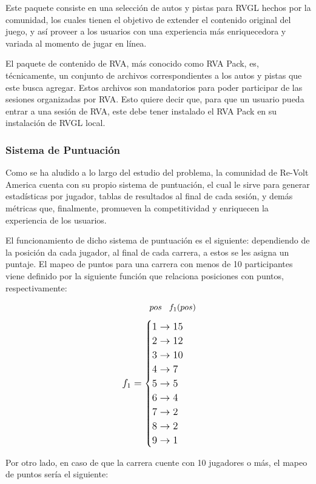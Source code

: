 Este paquete consiste en una selección de autos y pistas para RVGL hechos por la comunidad, los cuales tienen el objetivo de extender el contenido original del juego, y así proveer a los usuarios con una experiencia más enriquecedora y variada al momento de jugar en línea.

El paquete de contenido de RVA, más conocido como RVA Pack, es, técnicamente, un conjunto de archivos correspondientes a los autos y pistas que este busca agregar. Estos archivos son mandatorios para poder participar de las sesiones organizadas por RVA. Esto quiere decir que, para que un usuario pueda entrar a una sesión de RVA, este debe tener instalado el RVA Pack en su instalación de RVGL local.

\subsubsection{Sistema de Puntuación}
Como se ha aludido a lo largo del estudio del problema, la comunidad de Re-Volt America cuenta con su propio sistema de puntuación, el cual le sirve para generar estadísticas por jugador, tablas de resultados al final de cada sesión, y demás métricas que, finalmente, promueven la competitividad y enriquecen la experiencia de los usuarios.

El funcionamiento de dicho sistema de puntuación es el siguiente: dependiendo de la posición da cada jugador, al final de cada carrera, a estos se les asigna un puntaje. El mapeo de puntos para una carrera con menos de 10 participantes viene definido por la siguiente función que relaciona posiciones con puntos, respectivamente:

\newpage

\[\hspace*{1.2cm} pos \hspace*{0.3cm} f_1(pos)\]
\[
\mathlarger{
	f_1= 
	\begin{cases}
		1 \to 15 \\
		2 \to 12 \\
		3 \to 10 \\
		4 \to 7 \\
		5 \to 5 \\
		6 \to 4 \\
		7 \to 2 \\
		8 \to 2 \\
		9 \to 1
	\end{cases}
}
\]

Por otro lado, en caso de que la carrera cuente con 10 jugadores o más, el mapeo de puntos sería el siguiente:

